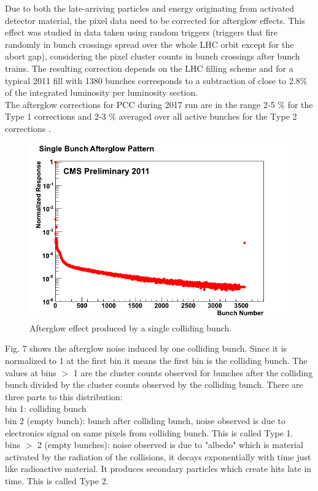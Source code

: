 Due to both the late-arriving particles and energy originating from activated detector material, the pixel data need to be corrected for afterglow effects. This effect was studied in data taken using random triggers (triggers that fire randomly in bunch crossings spread over the whole LHC orbit except for the abort gap), considering the pixel cluster counts in bunch crossings after bunch trains. The resulting correction depends on the LHC filling scheme and for a typical 2011 fill with 1380 bunches corresponds to a subtraction of close to 2.8$\%$ of the integrated luminosity per luminosity section. \\

The afterglow corrections for PCC during 2017 run are in the range 2-5 $\%$ for the Type 1 corrections and 2-3 $\%$ averaged over all active bunches for the Type 2 corrections \cite{Sirunyan:2759951}.

\begin{figure}[H]
  \centering
  \includegraphics[width=0.5\columnwidth]{./SingleBunchAfterglow.png}
  \caption{Afterglow effect produced by a single colliding bunch.}
  \label{fig:LHC}
\end{figure}


Fig. 7 shows the afterglow noise induced by one colliding bunch. Since it is normalized to 1 at the first bin it means the first bin is the colliding bunch. The values at bins $>$ 1 are the cluster counts observed for bunches after the colliding bunch divided by the cluster counts observed by the colliding bunch. There are three parts to this distribution: \\

bin 1: colliding bunch \\

bin 2 (empty bunch): bunch after colliding bunch, noise observed is due to electronics signal on same pixels from colliding bunch. This is called Type 1. \\

bins $>$ 2 (empty bunches): noise observed is due to "albedo" which is material activated by the radiation of the collisions, it decays exponentially with time just like radioactive material. It produces secondary particles which create hits late in time. This is called Type 2.

